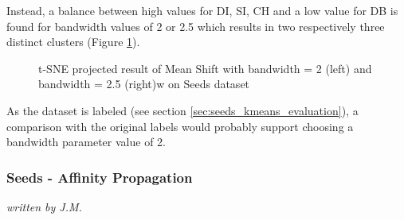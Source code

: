 Instead, a balance between high values for DI, SI, CH and a low value for DB is found for bandwidth values of 2 or 2.5 which results in two respectively three distinct clusters (Figure \ref{fig:meanshift_seeds_2_tsne}). 
\begin{figure}[H]
    \caption{t-SNE projected result of Mean Shift with bandwidth = 2 (left) and bandwidth = 2.5 (right)w on Seeds dataset}
    \label{fig:meanshift_seeds_2_tsne}
\end{figure}

As the dataset is labeled (see section \ref{sec:seeds_kmeans_evaluation}), a comparison with the original labels would probably support choosing a bandwidth parameter value of 2.

\subsubsection{Seeds - Affinity Propagation}
\textit{written by J.M.}\\

